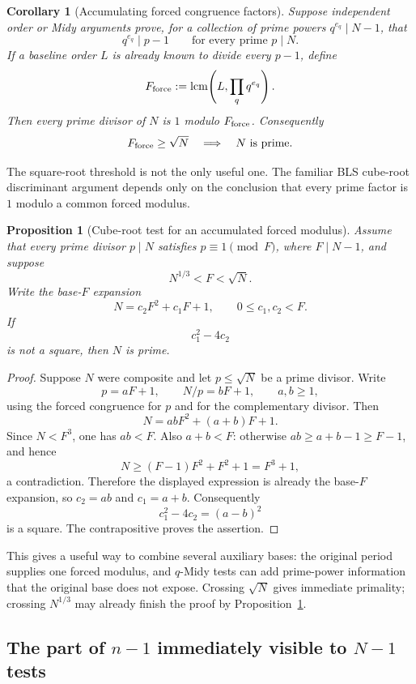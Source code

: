 \documentclass[11pt]{article}
\newtheorem{proposition}[theorem]{Proposition}
\newtheorem{corollary}[theorem]{Corollary}
\begin{document}
\begin{corollary}[Accumulating forced congruence factors]
\label{cor:forced-modulus}
Suppose independent order or Midy arguments prove, for a collection of prime
powers $q^{e_q}\mid N-1$, that
\[
q^{e_q}\mid p-1\qquad\text{for every prime }p\mid N.
\]
If a baseline order $L$ is already known to divide every $p-1$, define
\[
F_{\rm force}:=\operatorname{lcm}\!\left(L,\prod_q q^{e_q}\right).
\]
Then every prime divisor of $N$ is $1$ modulo $F_{\rm force}$.  Consequently
\[
F_{\rm force}\ge\sqrt N
\quad\Longrightarrow\quad N\text{ is prime}.
\]
\end{corollary}

The square-root threshold is not the only useful one.  The familiar BLS
cube-root discriminant argument depends only on the conclusion that every
prime factor is $1$ modulo a common forced modulus.

\begin{proposition}[Cube-root test for an accumulated forced modulus]
\label{prop:forced-modulus-cuberoot}
Assume that every prime divisor $p\mid N$ satisfies $p\equiv1\pmod F$, where
$F\mid N-1$, and suppose
\[
N^{1/3}<F<\sqrt N.
\]
Write the base-$F$ expansion
\[
N=c_2F^2+c_1F+1,
\qquad 0\le c_1,c_2<F.
\]
If
\[
c_1^2-4c_2
\]
is not a square, then $N$ is prime.
\end{proposition}

\begin{proof}
Suppose $N$ were composite and let $p\le\sqrt N$ be a prime divisor.  Write
\[
p=aF+1,
\qquad
N/p=bF+1,
\qquad a,b\ge1,
\]
using the forced congruence for $p$ and for the complementary divisor.  Then
\[
N=abF^2+(a+b)F+1.
\]
Since $N<F^3$, one has $ab<F$.  Also $a+b<F$: otherwise
$ab\ge a+b-1\ge F-1$, and hence
\[
N\ge(F-1)F^2+F^2+1=F^3+1,
\]
a contradiction.  Therefore the displayed expression is already the base-$F$
expansion, so $c_2=ab$ and $c_1=a+b$.  Consequently
\[
c_1^2-4c_2=(a-b)^2
\]
is a square.  The contrapositive proves the assertion.
\end{proof}

This gives a useful way to combine several auxiliary bases: the original
period supplies one forced modulus, and $q$-Midy tests can add prime-power
information that the original base does not expose.  Crossing $\sqrt N$
gives immediate primality; crossing $N^{1/3}$ may already finish the proof by
Proposition~\ref{prop:forced-modulus-cuberoot}.

\subsection{The part of $n-1$ immediately visible to $N-1$ tests}
\end{document}
